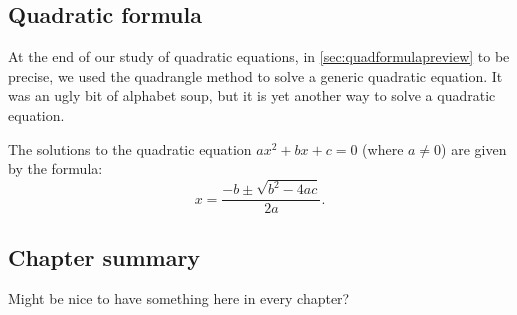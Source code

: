 \subsection{Quadratic formula}

At the end of our study of quadratic equations, in \cref{sec:quadformulapreview} to be precise, we used the quadrangle method to solve a generic quadratic equation. It was an ugly bit of alphabet soup, but it is yet another way to solve a quadratic equation.

\begin{boxeddef}
The solutions to the quadratic equation $ax^2 + bx + c=0$ (where $a\neq0$) are given by the formula:
\[x=\frac{-b\pm\sqrt{b^2-4ac}}{2a}.\]
\end{boxeddef}


%
%
%
%
%
%
%
%
%
%
%
%
%
%
%
%
%
%
%

\subsection*{Chapter summary}

Might be nice to have something here in every chapter?
